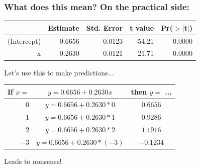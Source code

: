 \documentclass[aspectratio=169]{beamer}
\begin{document}
\begin{frame}
\frametitle{What does this mean? On the practical side:}
\begin{table}[ht]
\centering
\begin{tabular}{rrrrr}
  \hline
 & Estimate & Std. Error & t value & Pr($>$$|$t$|$) \\ 
  \hline
(Intercept) & 0.6656 & 0.0123 & 54.21 & 0.0000 \\ 
  x & 0.2630 & 0.0121 & 21.71 & 0.0000 \\ 
   \hline
\end{tabular}
\end{table}
\bigskip

 \begin{center}Let's use this to make predictions...  \end{center}
\begin{table}
\begin{tabular}{r | c | c }
If $x=$ & $y = 0.6656 + 0.2630x$ & then $y =$ ...  \\
\hline \hline
$0$ & $y = 0.6656 + 0.2630*0$ & $0.6656$   \\ 
$1$ & $y = 0.6656 + 0.2630*1$ & $0.9286$   \\ 
$2$ & $y = 0.6656 + 0.2630*2$ & $1.1916$   \\ 
$-3$ & $y = 0.6656 + 0.2630*(-3)$ & $-0.1234$   \\ 
\end{tabular}
\end{table}
\begin{center}Leads to nonsense!\end{center}
\end{frame}
\end{document}
